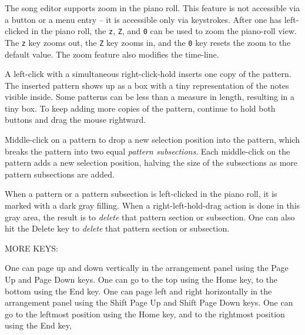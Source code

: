    The song editor supports zoom in the piano roll.
   This feature is not accessible via a button or a menu
   entry -- it is accessible only via keystrokes.
   After one has left-clicked in the piano roll, the \texttt{z}, \texttt{Z},
   and \texttt{0} can be used to zoom the piano-roll view.  The \texttt{z} key
   zooms out, the \texttt{Z} key zooms in, and the \texttt{0} key resets the
   zoom to the default value.  The zoom feature also modifies the time-line.

   A left-click with a simultaneous right-click-hold inserts one copy of the
   pattern.  The inserted pattern shows up as a box with a tiny
   representation of the notes visible inside.  Some patterns can
   be less than a measure in length, resulting in a tiny box.
   To keep adding more copies of the pattern, continue to hold both buttons
   and drag the mouse rightward.

   Middle-click on a pattern to drop a new selection position into the
   pattern,
   which breaks the pattern into two equal \textsl{pattern subsections}.
   Each middle-click on the pattern adds a new selection position,
   halving the size of the subsections as more pattern subsections are
   added.

   When a pattern or a pattern subsection is left-clicked in the piano
   roll, it is marked with a dark gray filling.
   When a right-left-hold-drag action is done in this gray area, the result
   is to \textsl{delete} that pattern section or subsection.
   One can also hit the Delete key to \textsl{delete} that pattern section
   or subsection.

   MORE KEYS:

   One can page up and down vertically in the arrangement
   panel using the
    Page Up and 
    Page Down keys.
   One can go to the top using the 
    Home key,
   to the bottom using the
    End key.
   One can page left and right horizontally in the arrangement
   panel using the
    Shift Page Up and 
    Shift Page Down keys.
   One can go to the leftmost position using the 
    Home key,
   and to the rightmost position using the
    End key,

